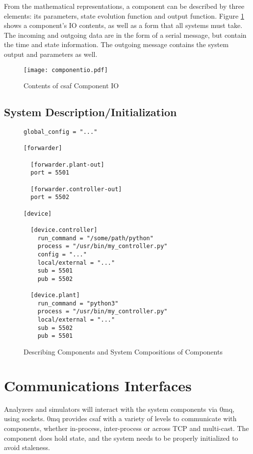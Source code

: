 From the mathematical representations, a component can be described by three elements: its parameters, 
state evolution function and output function. Figure \ref{fig:cio} shows a component's IO contents, as well as 
a form that all systems must take. The incoming and outgoing data are in the form of a serial message, but 
contain the time and state information. The outgoing message contains the system output and parameters as 
well.

\begin{figure}
\centering
\texttt{[image: componentio.pdf]}
\caption{Contents of \acrshort{csaf}  Component IO}
\label{fig:cio}
\end{figure}

\subsection{System Description/Initialization}

\begin{figure}
\begin{lstlisting}
global_config = "..."

[forwarder]

  [forwarder.plant-out]
  port = 5501

  [forwarder.controller-out]
  port = 5502

[device]

  [device.controller]
    run_command = "/some/path/python"
    process = "/usr/bin/my_controller.py"
    config = "..."
    local/external = "..."
    sub = 5501
    pub = 5502

  [device.plant]
    run_command = "python3"
    process = "/usr/bin/my_controller.py"
    local/external = "..."
    sub = 5502
    pub = 5501
\end{lstlisting}
\caption{Describing Components and System Compositions of Components}
\label{fig:sysset}
\end{figure}

\section{Communications Interfaces}

Analyzers and simulators will interact with the system components via \acrshort{0mq}, using sockets. \acrshort{0mq} 
provides \acrshort{csaf}  with a variety of levels to communicate with components, whether in-process, 
inter-process or across TCP and multi-cast. The component does hold state, and the system needs to be 
properly initialized to avoid staleness.

